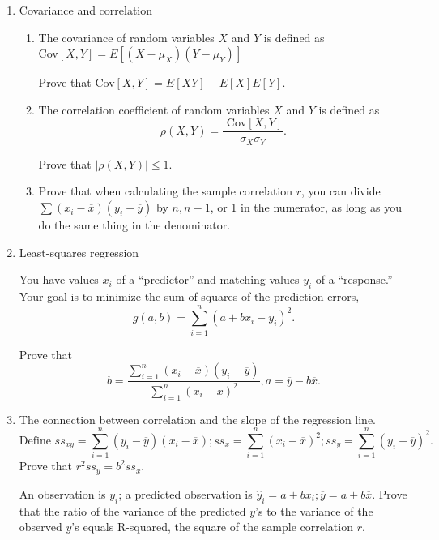 \documentclass[12pt]{article}
\begin{document}
\begin{enumerate}

\item Covariance and correlation

\begin{enumerate}
\item The covariance of random variables $X$ and $Y$ is defined as\\ Cov$[X,Y] = E[(X - \mu_X)(Y- \mu_Y)]$

Prove that Cov$[X,Y] = E[XY] -  E[X]E[Y].$

\vspace{100pt}

\item The correlation coefficient of random variables $X$ and $Y$ is defined as 
$$\rho(X, Y) = \frac {\text{ Cov}[X,Y]}{\sigma_X \sigma_Y}.$$

Prove that $|\rho(X,Y)| \leq 1.$

\vspace{100pt}


\item Prove that when calculating the sample correlation $r$, you can divide $\sum(x_i - \overline{x})(y_i - \overline{y})$ by $n, n-1$, or 1 in the numerator, as long as you do the same thing in the denominator.

\end{enumerate}

\pagebreak

\item Least-squares regression

You have values $x_i$ of a ``predictor'' and matching values $y_i$ of a ``response.'' Your goal is to minimize the sum of squares of the prediction errors,
$$g(a,b) = \sum_{i=1}^n( a + b x_i - y_i)^2.$$

Prove that 
$$b = \frac{\sum_{i=1}^n(x_i - \overline{x})(y_i - \overline{y})} {\sum_{i=1}^n(x_i - \overline{x})^2}, a =\overline{y} - b \overline{x}.$$

\pagebreak

\item The connection between correlation and the slope of the regression line.
$$\text{Define }ss_{xy} = \sum_{i=1}^n(y_i - \overline{y})(x_i - \overline{x}); ss_x = \sum_{i=1}^n(x_i - \overline{x})^2; ss_y = \sum_{i=1}^n(y_i - \overline{y})^2.$$
Prove that $r^2  ss_y = b^2 ss_x.$
\vspace{80pt}

An observation is $y_i$; a predicted observation is $\hat{y}_i = a + b x_i; \overline{y} = a + b\overline{x}$. Prove that the ratio of the variance of the predicted $y$'s to the variance of the observed $y$'s equals R-squared, the square of the sample correlation $r$.


\end{enumerate}
\end{document}

